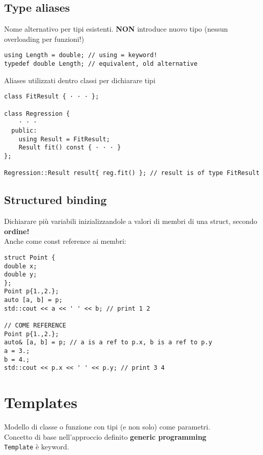 \documentclass[10pt, oneside]{Book}
\begin{document}
\section{Type aliases}
Nome alternativo per tipi esistenti. \textbf{NON} introduce nuovo tipo (nessun overloading per funzioni!)
\begin{verbatim}
using Length = double; // using = keyword!
typedef double Length; // equivalent, old alternative
\end{verbatim}
Aliases utilizzati dentro classi per dichiarare tipi 
\begin{verbatim}
class FitResult { · · · };

class Regression {
    · · ·
  public:
    using Result = FitResult;
    Result fit() const { · · · }
};

Regression::Result result{ reg.fit() }; // result is of type FitResult
\end{verbatim}

\section{Structured binding}
Dichiarare più variabili inizializzandole a valori di membri di una struct, secondo \textbf{ordine!}
\\Anche come const reference ai membri:
\begin{verbatim}
struct Point {
double x;
double y;
};
Point p{1.,2.};
auto [a, b] = p;
std::cout << a << ' ' << b; // print 1 2

// COME REFERENCE
Point p{1.,2.};
auto& [a, b] = p; // a is a ref to p.x, b is a ref to p.y
a = 3.;
b = 4.;
std::cout << p.x << ' ' << p.y; // print 3 4
\end{verbatim}

\chapter{Templates}
Modello di classe o funzione con tipi (e non solo) come parametri.
\\Concetto di base nell'approccio definito \textbf{generic programming}
\\\texttt{Template} è keyword.
\end{document}
